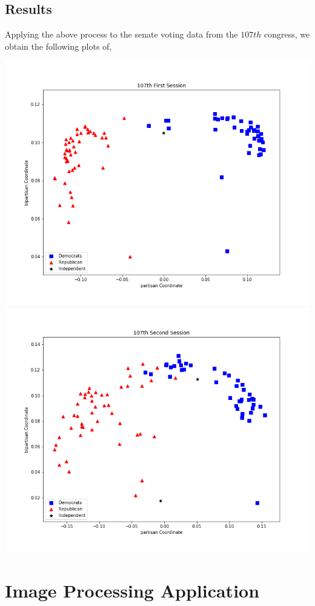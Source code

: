 \documentclass[letterpaper,12pt]{article}
\begin{document}
\subsection{Results}
Applying the above process to the senate voting data from the $107th$ congress, we obtain the following plots of,
\begin{center}
\includegraphics[scale=.5]{107th1.png}
\includegraphics[scale=.5]{107th2.png}
\end{center}
\section{Image Processing Application}
\end{document}
